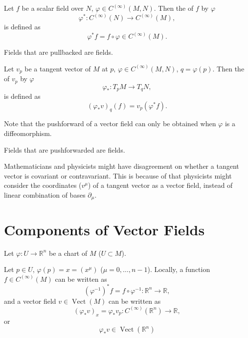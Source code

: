 \documentclass[openany, oneside, a5paper]{book}
\DeclareMathOperator{\Vect}{Vect}
\begin{document}
\begin{definition}[pullback]
    Let $f$ be a scalar field over $N$, $\varphi \in C^{(\infty)}(M, N)$. Then the  of $f$ by $\varphi$ 
    \begin{equation}
        \varphi^* \colon C^{(\infty)}(N) \to C^{(\infty)}(M),
    \end{equation}
    is defined as
    \begin{equation}
        \varphi^* f = f \circ \varphi \in C^{(\infty)}(M).
    \end{equation}
\end{definition}

Fields that are pullbacked are  fields.

\begin{definition}[pushforward]
    Let $v_p$ be a tangent vector of $M$ at $p$, $\varphi \in C^{(\infty)}(M, N)$, $q = \varphi(p)$. 
    Then the  of $v_p$ by $\varphi$ 
    \begin{equation}
        \varphi_* \colon T_p M \to T_q N,
    \end{equation}
    is defined as
    \begin{equation}
        (\varphi_* v)_q(f) = v_p(\varphi^* f).
    \end{equation}
\end{definition}

Note that the pushforward of a vector field can only be obtained when $\varphi$ is a diffeomorphism.

Fields that are pushforwarded are  fields.

Mathematicians and physicists might have disagreement on whether a tangent vector is covariant or contravariant.
This is because of that physicists might consider the coordinates ($v^\mu$) of a tangent vector as a vector field, instead of linear combination of bases $\partial_\mu$.

\section{Components of Vector Fields}

Let $\varphi \colon U \to \mathbb R^n$ be a chart of $M$ ($U \subset M$).

Let $p \in U$, $\varphi(p) = x = (x^\mu)$ ($\mu = 0, \ldots, n-1$).
Locally, a function $f \in C^{(\infty)}(M)$ can be written as
\begin{equation}
    (\varphi^{-1})^* f = f \circ \varphi^{-1} \colon \mathbb R^n \to \mathbb R,
\end{equation}
and a vector field $v \in \Vect(M)$ can be written as
\begin{equation}
    (\varphi_* v)_{x} = \varphi_* v_p \colon C^{(\infty)}(\mathbb R^n) \to \mathbb R,
\end{equation}
or
\begin{equation}
    \varphi_* v  \in \Vect(\mathbb R^n)
\end{equation}
\end{document}
